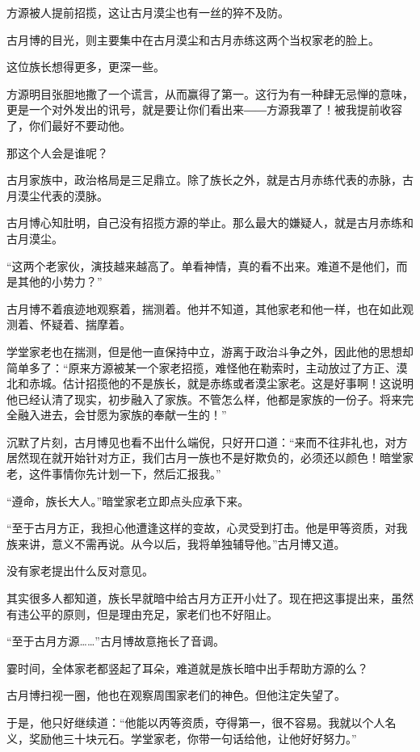 \begin{this_body}
方源被人提前招揽，这让古月漠尘也有一丝的猝不及防。

古月博的目光，则主要集中在古月漠尘和古月赤练这两个当权家老的脸上。

这位族长想得更多，更深一些。

方源明目张胆地撒了一个谎言，从而赢得了第一。这行为有一种肆无忌惮的意味，更是一个对外发出的讯号，就是要让你们看出来――方源我罩了！被我提前收容了，你们最好不要动他。

那这个人会是谁呢？

古月家族中，政治格局是三足鼎立。除了族长之外，就是古月赤练代表的赤脉，古月漠尘代表的漠脉。

古月博心知肚明，自己没有招揽方源的举止。那么最大的嫌疑人，就是古月赤练和古月漠尘。

“这两个老家伙，演技越来越高了。单看神情，真的看不出来。难道不是他们，而是其他的小势力？”

古月博不着痕迹地观察着，揣测着。他并不知道，其他家老和他一样，也在如此观测着、怀疑着、揣摩着。

学堂家老也在揣测，但是他一直保持中立，游离于政治斗争之外，因此他的思想却简单多了：“原来方源被某一个家老招揽，难怪他在勒索时，主动放过了方正、漠北和赤城。估计招揽他的不是族长，就是赤练或者漠尘家老。这是好事啊！这说明他已经认清了现实，初步融入了家族。不管怎么样，他都是家族的一份子。将来完全融入进去，会甘愿为家族的奉献一生的！”

沉默了片刻，古月博见也看不出什么端倪，只好开口道：“来而不往非礼也，对方居然现在就开始针对方正，我们古月一族也不是好欺负的，必须还以颜色！暗堂家老，这件事情你先计划一下，然后汇报我。”

“遵命，族长大人。”暗堂家老立即点头应承下来。

“至于古月方正，我担心他遭逢这样的变故，心灵受到打击。他是甲等资质，对我族来讲，意义不需再说。从今以后，我将单独辅导他。”古月博又道。

没有家老提出什么反对意见。

其实很多人都知道，族长早就暗中给古月方正开小灶了。现在把这事提出来，虽然有违公平的原则，但是理由充足，家老们也不好阻止。

“至于古月方源……”古月博故意拖长了音调。

霎时间，全体家老都竖起了耳朵，难道就是族长暗中出手帮助方源的么？

古月博扫视一圈，他也在观察周围家老们的神色。但他注定失望了。

于是，他只好继续道：“他能以丙等资质，夺得第一，很不容易。我就以个人名义，奖励他三十块元石。学堂家老，你带一句话给他，让他好好努力。”


\end{this_body}
